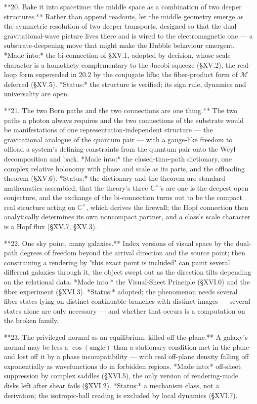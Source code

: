 **20. Bake it into spacetime: the middle space as a combination of two deeper structures.** Rather than append readouts, let the middle geometry emerge as the symmetric resolution of two deeper transports, designed so that the dual gravitational-wave picture lives there and is wired to the electromagnetic one — a substrate-deepening move that might make the Hubble behaviour emergent. *Made into:* the bi-connection of §XV.1, adopted by decision, whose scale character is a homothety complementary to the Jacobi squeeze (§XV.2), the real-loop form superseded in 20.2 by the conjugate lifts; the fiber-product form of $\mathcal M$ deferred (§XV.5). *Status:* the structure is verified; its sign rule, dynamics and universality are open.

**21. The two Born paths and the two connections are one thing.** The two paths a photon always requires and the two connections of the substrate would be manifestations of one representation-independent structure — the gravitational analogue of the quantum pair — with a gauge-like freedom to offload a system's defining constraints from the quantum pair onto the Weyl decomposition and back. *Made into:* the closed-time-path dictionary, one complex relative holonomy with phase and scale as its parts, and the offloading theorem (§XV.6). *Status:* the dictionary and the theorem are standard mathematics assembled; that the theory's three $\mathbb C^\times$'s are one is the deepest open conjecture, and the exchange of the bi-connection turns out to be the compact real structure acting on $\mathbb C^\times$, which derives the firewall; the Hopf connection then analytically determines its own noncompact partner, and a class's scale character is a Hopf flux (§XV.7, §XV.3).

**22. One sky point, many galaxies.** Index versions of visual space by the dual-path degrees of freedom beyond the arrival direction and the source point; then constraining a rendering by "this exact point is included" can paint several different galaxies through it, the object swept out as the direction tilts depending on the relational data. *Made into:* the Visual-Sheet Principle (§XVI.0) and the fiber experiment (§XVI.3). *Status:* adopted; the phenomenon needs several fiber states lying on distinct continuable branches with distinct images — several states alone are only necessary — and whether that occurs is a computation on the broken family.

**23. The privileged normal as an equilibrium, killed off the plane.** A galaxy's normal may be less a $\cos(\text{angle})$ than a stationary condition met in the plane and lost off it by a phase incompatibility — with real off-plane density falling off exponentially as wavefunctions do in forbidden regions. *Made into:* off-sheet suppression by complex saddles (§XVI.5), the only version of rendering-made disks left after shear fails (§XVI.2). *Status:* a mechanism class, not a derivation; the isotropic-ball reading is excluded by local dynamics (§XVI.7).

